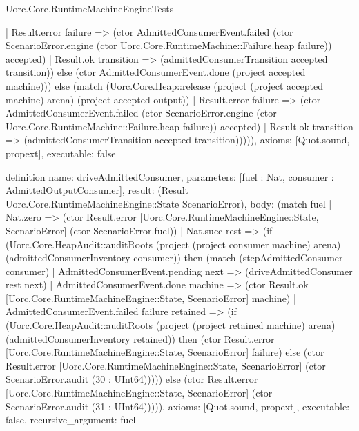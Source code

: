 \begin{lexlean}{Uorc.Core.RuntimeMachineEngineTests}
\begin{semanticmodule}
{      | Result.error failure => (ctor AdmittedConsumerEvent.failed (ctor ScenarioError.engine (ctor Uorc.Core.RuntimeMachine::Failure.heap failure)) accepted)
      | Result.ok transition => (admittedConsumerTransition accepted transition)) else (ctor AdmittedConsumerEvent.done (project accepted machine))) else (match (Uorc.Core.Heap::release (project (project accepted machine) arena) (project accepted output))
      | Result.error failure => (ctor AdmittedConsumerEvent.failed (ctor ScenarioError.engine (ctor Uorc.Core.RuntimeMachine::Failure.heap failure)) accepted)
      | Result.ok transition => (admittedConsumerTransition accepted transition))))),
  axioms: [Quot.sound, propext],
  executable: false
}

definition{
  name: driveAdmittedConsumer,
  parameters: [fuel : Nat, consumer : AdmittedOutputConsumer],
  result: (Result Uorc.Core.RuntimeMachineEngine::State ScenarioError),
  body: (match fuel
    | Nat.zero => (ctor Result.error [Uorc.Core.RuntimeMachineEngine::State, ScenarioError] (ctor ScenarioError.fuel))
    | Nat.succ rest => (if (Uorc.Core.HeapAudit::auditRoots (project (project consumer machine) arena) (admittedConsumerInventory consumer)) then (match (stepAdmittedConsumer consumer)
      | AdmittedConsumerEvent.pending next => (driveAdmittedConsumer rest next)
      | AdmittedConsumerEvent.done machine => (ctor Result.ok [Uorc.Core.RuntimeMachineEngine::State, ScenarioError] machine)
      | AdmittedConsumerEvent.failed failure retained => (if (Uorc.Core.HeapAudit::auditRoots (project (project retained machine) arena) (admittedConsumerInventory retained)) then (ctor Result.error [Uorc.Core.RuntimeMachineEngine::State, ScenarioError] failure) else (ctor Result.error [Uorc.Core.RuntimeMachineEngine::State, ScenarioError] (ctor ScenarioError.audit (30 : UInt64))))) else (ctor Result.error [Uorc.Core.RuntimeMachineEngine::State, ScenarioError] (ctor ScenarioError.audit (31 : UInt64))))),
  axioms: [Quot.sound, propext],
  executable: false,
  recursive_argument: fuel
}


\end{semanticmodule}
\end{lexlean}
